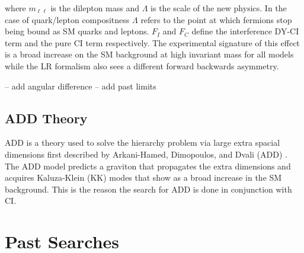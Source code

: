        where $m_{\ell\ell}$ is the dilepton mass and $\Lambda$ is the scale of the new physics. In the case of quark/lepton compositness $\Lambda$ refers to the point at which fermions stop being bound as SM quarks and leptons. $F_{I}$ and $F_{C}$ define the interference DY-CI term and the pure CI term respectively. The experimental signature of this effect is a broad increase on the SM background at high invariant mass for all models while the LR formalism also sees a different forward backwards asymmetry.

        -- add angular difference
        -- add past limits




    \subsection{ADD Theory}
        ADD is a theory used to solve the hierarchy problem via large extra spacial dimensions first described by Arkani-Hamed, Dimopoulos, and Dvali (ADD) \cite{ADD}. The ADD model predicts a graviton that propagates the extra dimensions and acquires Kaluza-Klein (KK) modes that show as a broad increase in the SM background. This is the reason the search for ADD is done in conjunction with CI.




\section{Past Searches}











